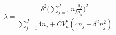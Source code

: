 \begin{equation}
\label{weightedlambda}
\lambda = \frac{\delta^2 \Big(\sum\limits_{j=1}^J n_j \frac{a_j}{\mu_a}\Big)^2 }{\sum\limits_{j=1}^J 4n_j + CV_{a}^2(4n_j + \delta^2n_j^2)}
\end{equation}